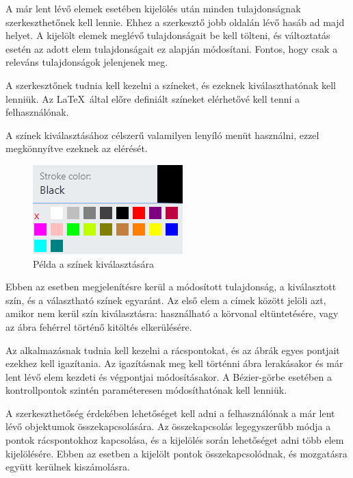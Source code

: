 A már lent lévő elemek esetében kijelölés után minden tulajdonságnak szerkeszthetőnek kell lennie. Ehhez a szerkesztő jobb oldalán lévő hasáb ad majd helyet. A kijelölt elemek meglévő tulajdonságait be kell tölteni, és változtatás esetén az adott elem tulajdonságait ez alapján módosítani. Fontos, hogy csak a releváns tulajdonságok jelenjenek meg.


A szerkesztőnek tudnia kell kezelni a színeket, és ezeknek kiválaszthatónak kell lenniük. Az \LaTeX\ által előre definiált színeket elérhetővé kell tenni a felhasználónak. 

A színek kiválasztásához célszerű valamilyen lenyíló menüt használni, ezzel megkönnyítve ezeknek az elérését. 

\begin{figure}[!h]
	\centering
	\label{fig:cp}
	\includegraphics[]{images/colorpicker.png}
	\caption{Példa a színek kiválasztására}
\end{figure}

Ebben az esetben megjelenítésre kerül a módosított tulajdonság, a kiválasztott szín, és a választható színek egyaránt. Az első elem a címek között jelöli azt, amikor nem kerül szín kiválasztásra: használható a körvonal eltüntetésére, vagy az ábra fehérrel történő kitöltés elkerülésére.


Az alkalmazásnak tudnia kell kezelni a rácspontokat, és az ábrák egyes pontjait ezekhez kell igazítania. Az igazításnak meg kell történni ábra lerakásakor és már lent lévő elem kezdeti és végpontjai módosításakor. A Bézier-görbe esetében a kontrollpontok szintén paraméteresen módosíthatónak kell lenniük.


A szerkeszthetőség érdekében lehetőséget kell adni a felhasználónak a már lent lévő objektumok összekapcsolására. Az összekapcsolás legegyszerűbb módja a pontok rácspontokhoz kapcsolása, és a kijelölés során lehetőséget adni több elem kijelölésére. Ebben az esetben a kijelölt pontok összekapcsolódnak, és mozgatásra együtt kerülnek kiszámolásra.


